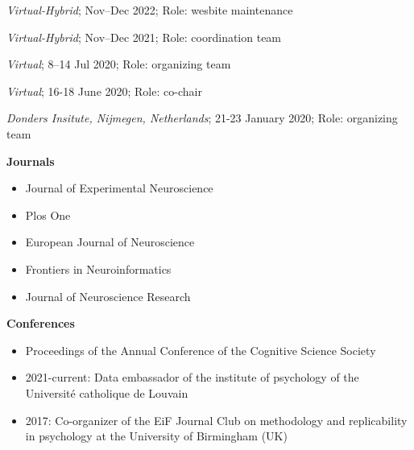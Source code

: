 
\textit{Virtual-Hybrid};
Nov--Dec 2022;
Role: wesbite maintenance

\textit{Virtual-Hybrid};
Nov--Dec 2021;
Role: coordination team

%
\textit{Virtual};
8--14 Jul 2020;
Role: organizing team

%
\textit{Virtual};
16-18 June 2020;
Role: co-chair

%
\textit{Donders Insitute, Nijmegen, Netherlands};
21-23 January 2020;
Role: organizing team



\textbf{Journals}

\begin{itemize}
    \item Journal of Experimental Neuroscience
    \item Plos One
    \item European Journal of Neuroscience
    \item Frontiers in Neuroinformatics
    \item Journal of Neuroscience Research
\end{itemize}

\textbf{Conferences}

\begin{itemize}
    \item Proceedings of the Annual Conference of the Cognitive Science Society
\end{itemize}



\begin{itemize}
    \item 2021-current: Data embassador of the institute of psychology of the Université catholique de Louvain
    \item 2017: Co-organizer of the EiF Journal Club on methodology and replicability in psychology at the University of Birmingham (UK)
\end{itemize}

